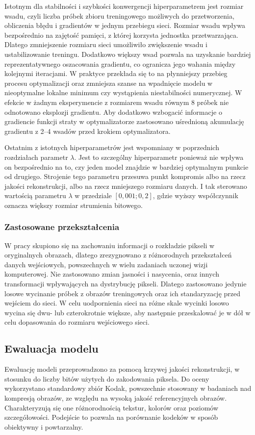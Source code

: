 Istotnym dla stabilności i szybkości konwergencji hiperparametrem jest rozmiar wsadu, czyli liczba próbek zbioru treningowego możliwych do przetworzenia, obliczenia błędu i gradientów w jednym przebiegu sieci. Rozmiar wsadu wpływa bezpośrednio na zajętość pamięci, z której korzysta jednostka przetwarzająca. Dlatego zmniejszenie rozmiaru sieci umożliwiło zwiększenie wsadu i ustabilizowanie treningu. Dodatkowo większy wsad pozwala na uzyskanie bardziej reprezentatywnego oszacowania gradientu, co ogranicza jego wahania między kolejnymi iteracjami. W praktyce przekłada się to na płynniejszy przebieg procesu optymalizacji oraz zmniejsza szanse na wpadnięcie modelu w nieoptymalne lokalne minimum czy wystąpienia niestabilności numerycznej. W efekcie w żadnym eksperymencie z rozmiarem wsadu równym 8 próbek nie odnotowano eksplozji gradientu. Aby dodatkowo wzbogacić informacje o gradiencie funkcji straty w optymalizatorze zastosowano uśrednioną akumulację gradientu z 2--4 wsadów przed krokiem optymalizatora.

Ostatnim z istotnych hiperparametrów jest wspomniany w poprzednich rozdziałach parametr \( \lambda \). Jest to szczególny hiperparametr ponieważ nie wpływa on bezpośrednio na to, czy jeden model znajdzie w bardziej optymalnym punkcie od drugiego. Strojenie tego parametru przesuwa punkt kompromis albo na rzecz jakości rekonstrukcji, albo na rzecz mniejszego rozmiaru danych. I tak sterowano wartością parametru \( \lambda \) w przedziale \( \left[ 0,001; 0,2 \right] \), gdzie wyższy współczynnik oznacza większy rozmiar strumienia bitowego.
\subsubsection{Zastosowane przekształcenia}
W pracy skupiono się na zachowaniu informacji o rozkładzie pikseli w oryginalnych obrazach, dlatego zrezygnowano z różnorodnych przekształceń danych wejściowych, powszechnych w wielu zadaniach uczonej wizji komputerowej. Nie zastosowano zmian jasności i nasycenia, oraz innych transformacji wpływających na dystrybucję pikseli. Dlatego zastosowano jedynie losowe wycinanie próbek z obrazów treningowych oraz ich standaryzację przed wejściem do sieci. W celu uodpornienia sieci na różne skale wycinki losowo wycina się dwu- lub czterokrotnie większe, aby następnie przeskalować je w dół w celu dopasowania do rozmiaru wejściowego sieci.

\subsection{Ewaluacja modelu}
Ewaluację modeli przeprowadzono za pomocą krzywej jakości rekonstrukcji, w stosunku do liczby bitów użytych do zakodowania piksela. Do oceny wykorzystano standardowy zbiór Kodak, powszechnie stosowany w badaniach nad kompresją obrazów, ze względu na wysoką jakość referencyjnych obrazów. Charakteryzują się one różnorodnością tekstur, kolorów oraz poziomów szczegółowości. Podejście to pozwala na porównanie kodeków w sposób obiektywny i powtarzalny.

